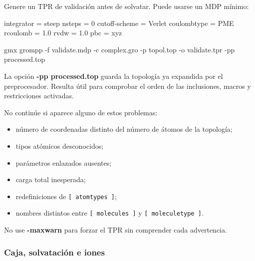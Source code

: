 \documentclass[
  spanish,
  11pt,
  a4paper]{article}
\newenvironment{Shaded}{\begin{snugshade}}{\end{snugshade}}
\newcommand{\AttributeTok}[1]{\textcolor[rgb]{0.13,0.29,0.53}{#1}}
\newcommand{\DataTypeTok}[1]{\textcolor[rgb]{0.13,0.29,0.53}{#1}}
\newcommand{\DecValTok}[1]{\textcolor[rgb]{0.00,0.00,0.81}{#1}}
\newcommand{\ExtensionTok}[1]{#1}
\newcommand{\FloatTok}[1]{\textcolor[rgb]{0.00,0.00,0.81}{#1}}
\newcommand{\NormalTok}[1]{#1}
\newcommand{\OtherTok}[1]{\textcolor[rgb]{0.56,0.35,0.01}{#1}}
\newcommand{\StringTok}[1]{\textcolor[rgb]{0.31,0.60,0.02}{#1}}
\providecommand{\tightlist}{%
  \setlength{\itemsep}{0pt}\setlength{\parskip}{0pt}}
\begin{document}
Genere un TPR de validación antes de solvatar. Puede usarse un MDP
mínimo:

\begin{Shaded}
\begin{Highlighting}[]
\DataTypeTok{integrator      }\OtherTok{=}\StringTok{ steep}
\DataTypeTok{nsteps          }\OtherTok{=}\StringTok{ }\DecValTok{0}
\DataTypeTok{cutoff{-}scheme   }\OtherTok{=}\StringTok{ Verlet}
\DataTypeTok{coulombtype     }\OtherTok{=}\StringTok{ PME}
\DataTypeTok{rcoulomb        }\OtherTok{=}\StringTok{ }\FloatTok{1.0}
\DataTypeTok{rvdw            }\OtherTok{=}\StringTok{ }\FloatTok{1.0}
\DataTypeTok{pbc             }\OtherTok{=}\StringTok{ xyz}
\end{Highlighting}
\end{Shaded}

\begin{Shaded}
\begin{Highlighting}[]
\ExtensionTok{gmx}\NormalTok{ grompp     }\AttributeTok{{-}f}\NormalTok{ validate.mdp     }\AttributeTok{{-}c}\NormalTok{ complex.gro     }\AttributeTok{{-}p}\NormalTok{ topol.top     }\AttributeTok{{-}o}\NormalTok{ validate.tpr     }\AttributeTok{{-}pp}\NormalTok{ processed.top}
\end{Highlighting}
\end{Shaded}

La opción \textbf{-pp processed.top} guarda la topología ya expandida
por el preprocesador. Resulta útil para comprobar el orden de las
inclusiones, macros y restricciones activadas.

No continúe si aparece alguno de estos problemas:

\begin{itemize}
\tightlist
\item
  número de coordenadas distinto del número de átomos de la topología;
\item
  tipos atómicos desconocidos;
\item
  parámetros enlazados ausentes;
\item
  carga total inesperada;
\item
  redefiniciones de \texttt{{[}\ atomtypes\ {]}};
\item
  nombres distintos entre \texttt{{[}\ molecules\ {]}} y
  \texttt{{[}\ moleculetype\ {]}}.
\end{itemize}

No use \textbf{-maxwarn} para forzar el TPR sin comprender cada
advertencia.

\subsubsection{Caja, solvatación e
iones}\label{caja-solvataciuxf3n-e-iones}
\end{document}

